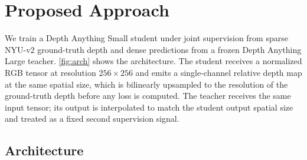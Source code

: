 \documentclass[10pt,twocolumn,letterpaper]{article}
\begin{document}
\section{Proposed Approach}
\label{sec:approach}

We train a Depth Anything Small student under joint supervision from
sparse NYU-v2 ground-truth depth and dense predictions from a frozen
Depth Anything Large teacher. \cref{fig:arch} shows the architecture.
The student receives a normalized RGB tensor at resolution
$256{\times}256$ and emits a single-channel relative depth map at the
same spatial size, which is bilinearly upsampled to the resolution of
the ground-truth depth before any loss is computed. The teacher receives
the same input tensor; its output is interpolated to match the student
output spatial size and treated as a fixed second supervision signal.

\subsection{Architecture}
\label{sec:architecture}
\end{document}
